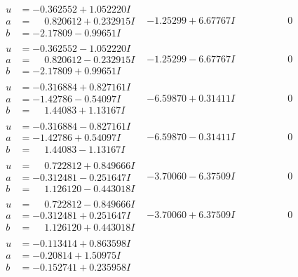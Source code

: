 \documentclass[1p]{elsarticle_modified}
\theoremstyle{definition}
\begin{document}
$$\begin{array}{c|c|c}
 \hline 
\begin{aligned}
u &= -0.362552 + 1.052220 I \\
a &= \phantom{-}0.820612 + 0.232915 I \\
b &= -2.17809 - 0.99651 I\end{aligned}
 & -1.25299 + 6.67767 I & \phantom{-0.000000 } 0 \\ \hline\begin{aligned}
u &= -0.362552 - 1.052220 I \\
a &= \phantom{-}0.820612 - 0.232915 I \\
b &= -2.17809 + 0.99651 I\end{aligned}
 & -1.25299 - 6.67767 I & \phantom{-0.000000 } 0 \\ \hline\begin{aligned}
u &= -0.316884 + 0.827161 I \\
a &= -1.42786 - 0.54097 I \\
b &= \phantom{-}1.44083 + 1.13167 I\end{aligned}
 & -6.59870 + 0.31411 I & \phantom{-0.000000 } 0 \\ \hline\begin{aligned}
u &= -0.316884 - 0.827161 I \\
a &= -1.42786 + 0.54097 I \\
b &= \phantom{-}1.44083 - 1.13167 I\end{aligned}
 & -6.59870 - 0.31411 I & \phantom{-0.000000 } 0 \\ \hline\begin{aligned}
u &= \phantom{-}0.722812 + 0.849666 I \\
a &= -0.312481 - 0.251647 I \\
b &= \phantom{-}1.126120 - 0.443018 I\end{aligned}
 & -3.70060 - 6.37509 I & \phantom{-0.000000 } 0 \\ \hline\begin{aligned}
u &= \phantom{-}0.722812 - 0.849666 I \\
a &= -0.312481 + 0.251647 I \\
b &= \phantom{-}1.126120 + 0.443018 I\end{aligned}
 & -3.70060 + 6.37509 I & \phantom{-0.000000 } 0 \\ \hline\begin{aligned}
u &= -0.113414 + 0.863598 I \\
a &= -0.20814 + 1.50975 I \\
b &= -0.152741 + 0.235958 I\end{aligned}

\end{array}$$
\end{document}
